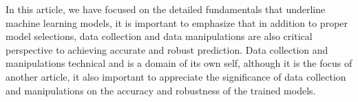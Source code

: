 
\par
In this article, we have focused on the detailed fundamentals that underline machine learning models, it is important to emphasize that in addition to proper model selections, data collection and data manipulations are also critical perspective to achieving accurate and robust prediction. Data collection and manipulations  technical and is a domain of its own self, although it is the focus of another article, it also important to appreciate the significance of data collection and manipulations on the accuracy and robustness of the trained models.
\par 
